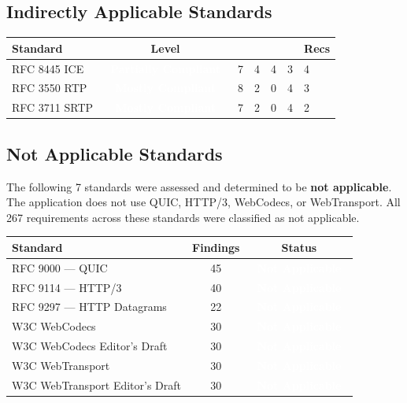 \documentclass[11pt,letterpaper]{article}
\newcommand{\mostlycompliant}{\colorbox{partial}{\textcolor{white}{\textbf{\small~Mostly Compliant~}}}}
\newcommand{\partiallycompliant}{\colorbox{noncompliant}{\textcolor{white}{\textbf{\small~Partially Compliant~}}}}
\newcommand{\notapplicablebadge}{\colorbox{notapplicable}{\textcolor{white}{\textbf{\small~Not Applicable~}}}}
\begin{document}
\subsection{Indirectly Applicable Standards}

\begin{center}
\begin{tabularx}{\textwidth}{L{3.8cm}cccccX}
\toprule
\textbf{Standard} & \textbf{Level} &  &  &  &  & \textbf{Recs} \\
\midrule
RFC 8445 ICE & \partiallycompliant & 7 & 4 & 4 & 3 & 4 \\
RFC 3550 RTP & \mostlycompliant & 8 & 2 & 0 & 4 & 3 \\
RFC 3711 SRTP & \mostlycompliant & 7 & 2 & 0 & 4 & 2 \\
\bottomrule
\end{tabularx}
\end{center}

\subsection{Not Applicable Standards}

The following 7 standards were assessed and determined to be \textbf{not applicable}. The application does not use QUIC, HTTP/3, WebCodecs, or WebTransport. All 267 requirements across these standards were classified as not applicable.

\begin{center}
\begin{tabular}{lcc}
\toprule
\textbf{Standard} & \textbf{Findings} & \textbf{Status} \\
\midrule
RFC 9000 --- QUIC & 45 & \notapplicablebadge \\
RFC 9114 --- HTTP/3 & 40 & \notapplicablebadge \\
RFC 9297 --- HTTP Datagrams & 22 & \notapplicablebadge \\
W3C WebCodecs & 30 & \notapplicablebadge \\
W3C WebCodecs Editor's Draft & 30 & \notapplicablebadge \\
W3C WebTransport & 30 & \notapplicablebadge \\
W3C WebTransport Editor's Draft & 30 & \notapplicablebadge \\
\bottomrule
\end{tabular}
\end{center}
\end{document}

